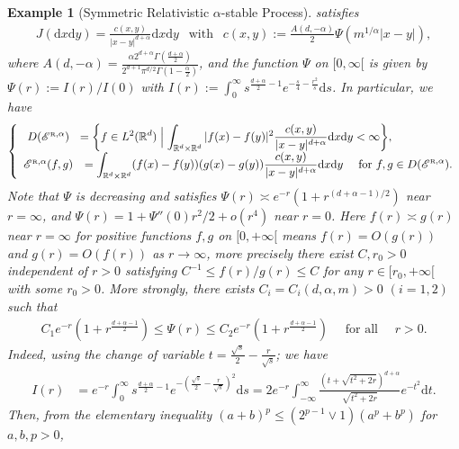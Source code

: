 \documentclass[12pt,a4paper]{article}
\newtheorem{example}[thm]{Example}
\newcommand{\R}{\mathbb{R}}
\renewcommand{\d}{\mathrm{d}}
\newcommand{\1}{{\bf 1}}
\begin{document}
\begin{example}[Symmetric Relativistic $\alpha$-stable Process]
satisfies
\begin{align*}
J({\d} x{\d} y)=\frac{c(x,y)}{|x-y|^{d+\alpha}}{\d} x{\d} y\ \ \text{ with }\ \ c(x,y):=\frac{A(d,-\alpha)}{2}
\Psi(m^{1/\alpha}|x-y|),
\end{align*}
where $A(d,-\alpha)=\frac{\alpha 2^{d+\alpha}\Gamma(\frac{d+\alpha}{2})}{2^{d+1}\pi^{d/2}\Gamma(1-\frac{\alpha}{2})}$, and the function $\Psi$ on $[0,\infty[$ is given by
$\Psi(r):=I(r)/I(0)$ with $I(r):=\int_0^{\infty}s^{\frac{d+\alpha}{2}-1}e^{-\frac{s}{4}-\frac{r^2}{s}}{\d} s$.
In particular,
we have
\begin{align*}
\left\{\begin{array}{cc}D(\mathscr{E}^{\text{\tiny\rm R},\alpha})&\hspace{-2cm}=\displaystyle{\left\{f\in L^2(\R^d)\;\Bigl|\;\int_{\R^d\times\R^d}|f(x)-f(y)|^2\frac{c(x,y)}{|x-y|^{d+\alpha}}{\d} x{\d} y<\infty  \right\}}, \\
\mathscr{E}^{\text{\tiny\rm R},\alpha}(f,g)&=\displaystyle{\int_{\R^d\times\R^d}
(f(x)-f(y))(g(x)-g(y))\frac{c(x,y)}{|x-y|^{d+\alpha}}{\d} x{\d} y
\quad\text{ for }f,g\in D(\mathscr{E}^{\text{\tiny\rm R},\alpha})}.
\end{array}\right.
\end{align*}
Note that
$\Psi$ is decreasing and satisfies
$\Psi(r)\asymp e^{-r}(1+r^{(d+\alpha-1)/2})$ near $r=\infty$, and $\Psi(r)=1+\Psi''(0)r^2/2+o(r^4)$ near $r=0$.  Here $f(r)\asymp g(r)$ 
near $r=\infty$ 
for positive functions $f,g$ on $[0,+\infty[$ means  
$f(r)=O(g(r))$ and $g(r)=O(f(r))$ as $r\to\infty$, more precisely 
there exist $C,r_0>0$ independent of $r>0$ satisfying $C^{-1}\leq f(r)/g(r)\leq C$ for any 
$r\in[r_0,+\infty[$ with some $r_0>0$.
More strongly, there exists $C_i=C_i(d,\alpha,m)>0$ $(i=1,2)$ such that 
\begin{align}
C_1e^{-r}(1+r^{\frac{d+\alpha-1}{2}})\leq \Psi(r)\leq C_2e^{-r}(1+r^{\frac{d+\alpha-1}{2}})\quad\text{ for all }\quad r>0.\label{eq:LowerBoundsPhi}
\end{align}
Indeed, using the change of variable $t=\frac{\sqrt{s}}{2}-\frac{r}{\sqrt{s}}$; we have
\begin{align*}
I(r)&=e^{-r}\int_{0}^{\infty}s^{\frac{d+\alpha}{2}-1}
e^{-\left(\frac{\sqrt{s}}{2}-\frac{r}{\sqrt{s}}\right)^2}{\d} s=2e^{-r}\int_{-\infty}^{\infty}\frac{(t+\sqrt{t^2+2r})^{d+\alpha}}{\sqrt{t^2+2r}}e^{-t^2}{\d} t.
\end{align*}
Then, from the elementary inequality $(a+b)^p\leq (2^{p-1}\lor1)(a^p+b^p)$ for $a,b,p>0$,  
\begin{align*}

\end{align*}
\end{example}
\end{document}
